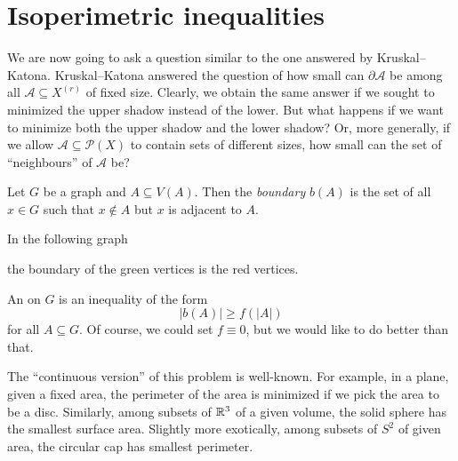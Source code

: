 \documentclass[a4paper]{article}
\begin{document}
\section{Isoperimetric inequalities}
We are now going to ask a question similar to the one answered by Kruskal--Katona. Kruskal--Katona answered the question of how small can $\partial \mathcal{A}$ be among all $\mathcal{A} \subseteq X^{(r)}$ of fixed size. Clearly, we obtain the same answer if we sought to minimized the upper shadow instead of the lower. But what happens if we want to minimize both the upper shadow and the lower shadow? Or, more generally, if we allow $\mathcal{A} \subseteq \mathcal{P}(X)$ to contain sets of different sizes, how small can the set of ``neighbours'' of $\mathcal{A}$ be?

\begin{defi}[Boundary]
  Let $G$ be a graph and $A \subseteq V(A)$. Then the \emph{boundary} $b(A)$ is the set of all $x \in G$ such that $x \not \in A$ but $x$ is adjacent to $A$.
\end{defi}

\begin{eg}
  In the following graph
  \begin{center}
  \end{center}
  the boundary of the green vertices is the red vertices.
\end{eg}

An  on $G$ is an inequality of the form
\[
  |b(A)| \geq f(|A|)
\]
for all $A \subseteq G$. Of course, we could set $f \equiv 0$, but we would like to do better than that.

The ``continuous version'' of this problem is well-known. For example, in a plane, given a fixed area, the perimeter of the area is minimized if we pick the area to be a disc. Similarly, among subsets of $\mathbb{R}^3$ of a given volume, the solid sphere has the smallest surface area. Slightly more exotically, among subsets of $S^2$ of given area, the circular cap has smallest perimeter.
\end{document}
